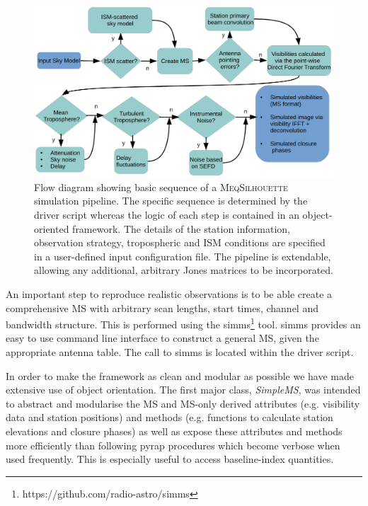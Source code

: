 \begin{figure}
\begin{center}
\includegraphics[width=\columnwidth]{Images/flow_full}
\caption{Flow diagram showing basic sequence of a \textsc{MeqSilhouette} simulation pipeline. The specific sequence is determined by the driver script whereas the logic of each step is contained in an object-oriented framework. The details of the station information, observation strategy, tropospheric and ISM conditions are specified in a user-defined input configuration file. The pipeline is extendable, allowing any additional, arbitrary Jones matrices to be incorporated. \label{flow}%
}
\end{center}
\end{figure}

An important step to reproduce realistic observations is to be able create a comprehensive MS with arbitrary scan lengths, start times, channel and bandwidth structure. This is performed using the {\sc simms}\footnote{https://github.com/radio-astro/simms} tool. {\sc simms} provides an easy to use command line interface to construct a general MS, given the appropriate antenna table. The call to {\sc simms} is located within the driver script. 

In order to make the framework as clean and  modular as possible we have made extensive use of object orientation. The first major class, \emph{SimpleMS}, was intended to abstract and modularise the MS and MS-only derived attributes (e.g. visibility data and station positions) and methods (e.g. functions to calculate station elevations and closure phases) as well as expose these attributes and methods more efficiently than following {\sc pyrap} procedures which become verbose when used frequently. This is especially useful to access baseline-index quantities. 

